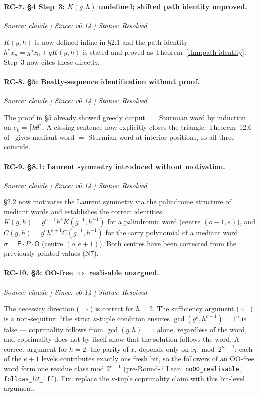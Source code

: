 \documentclass[12pt]{article}
\theoremstyle{definition}
\theoremstyle{remark}
\theoremstyle{plain}
\newcommand{\OO}{\mathsf{O}}
\newcommand{\EE}{\mathsf{E}}
\begin{document}
\paragraph{RC-7. \S4 Step~3: $K(g,h)$ undefined; shifted path identity unproved.}
\textit{Source: claude | Since: v0.14 | Status: Resolved}

$K(g,h)$ is now defined inline in \S2.1 and the path identity
$h^e x_n = g^o x_0 + q K(g,h)$ is stated and proved as
Theorem~\ref{thm:path-identity}.  Step~3 now cites these directly.

\paragraph{RC-8. \S5: Beatty-sequence identification without proof.}
\textit{Source: claude | Since: v0.14 | Status: Resolved}

The proof in \S5 already showed greedy output $=$ Sturmian word by induction on
$e_k = \lceil k\theta \rceil$.  A closing sentence now explicitly closes the
triangle: Theorem~12.6 of~\cite{paper76} gives mediant word $=$ Sturmian word at
interior positions, so all three coincide.

\paragraph{RC-9. \S8.1: Laurent symmetry introduced without motivation.}
\textit{Source: claude | Since: v0.14 | Status: Resolved}

\S2.2 now motivates the Laurent symmetry via the palindrome structure of mediant
words and establishes the correct identities: $K(g,h) = g^{o-1} h^e K(g^{-1},h^{-1})$
for a palindromic word (centre $(o-1,e)$), and $C(g,h) = g^o h^{e+1} C(g^{-1},h^{-1})$
for the carry polynomial of a mediant word $\sigma = \EE \cdot P \cdot \OO$
(centre $(o,e+1)$).  Both centres have been corrected from the previously printed
values (N7).

\paragraph{RC-10. \S3: OO-free $\Leftrightarrow$ realisable unargued.}
\textit{Source: claude | Since: v0.14 | Status: Resolved}

The necessity direction ($\Rightarrow$) is correct for $h = 2$.  The sufficiency
argument ($\Leftarrow$) is a non-sequitur: ``the strict $\kappa$-tuple condition
ensures $\gcd(g^o, h^{e+1}) = 1$'' is false --- coprimality follows from
$\gcd(g,h) = 1$ alone, regardless of the word, and coprimality does not by itself
show that the solution follows the word.  A correct argument for $h = 2$: the
parity of $x_i$ depends only on $x_0 \bmod 2^{\kappa_i+1}$; each of the $e+1$
levels contributes exactly one fresh bit, so the followers of an OO-free word
form one residue class mod $2^{e+1}$ (pre-Round-7 Lean: \texttt{noOO\_realisable},
\texttt{follows\_h2\_iff}).  Fix: replace the $\kappa$-tuple coprimality claim
with this bit-level argument.
\end{document}
